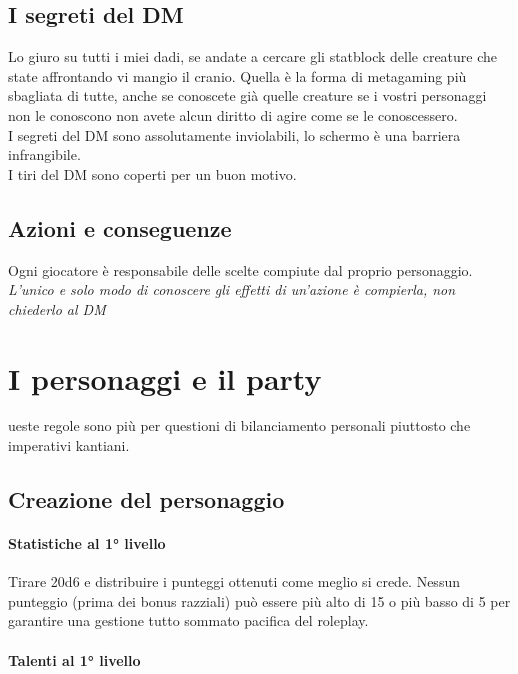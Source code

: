 \subsection{I segreti del DM}

Lo giuro su tutti i miei dadi, se andate a cercare gli statblock delle creature che state affrontando vi mangio il cranio. Quella è la forma di metagaming più sbagliata di tutte, anche se conoscete già quelle creature se i vostri personaggi non le conoscono non avete alcun diritto di agire come se le conoscessero.\\ I segreti del DM sono assolutamente inviolabili, lo schermo è una barriera infrangibile. \\ I tiri del DM sono coperti per un buon motivo.

\subsection{Azioni e conseguenze}

Ogni giocatore è responsabile delle scelte compiute dal proprio personaggio. \\ \textit{L'unico e solo modo di conoscere gli effetti di un'azione è compierla, non chiederlo al DM}

\section{I personaggi e il party}

ueste regole sono più per questioni di bilanciamento personali piuttosto che imperativi kantiani.

\subsection{Creazione del personaggio}

\paragraph{Statistiche al 1° livello}

Tirare 20d6 e distribuire i punteggi ottenuti come meglio si crede. Nessun punteggio (prima dei bonus razziali) può essere più alto di 15 o più basso di 5 per garantire una gestione tutto sommato pacifica del roleplay.

\paragraph{Talenti al 1° livello}

